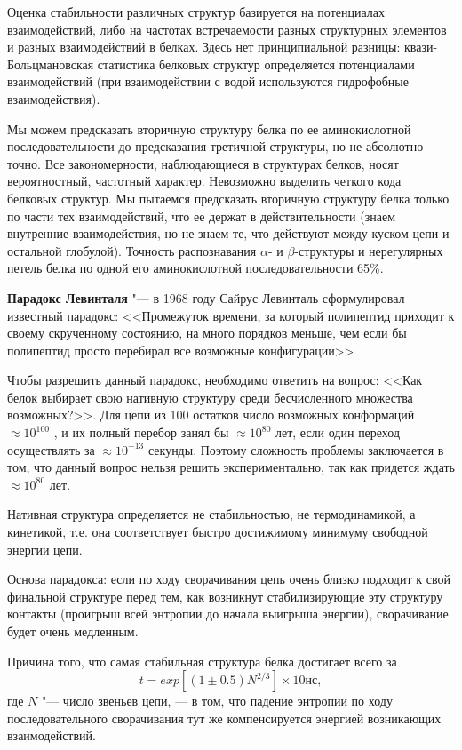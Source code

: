 \documentclass[12pt,a4paper,oneside]{book}
\begin{document}
Оценка стабильности различных структур базируется на потенциалах взаимодействий, либо на частотах встречаемости разных структурных элементов и разных взаимодействий в белках. Здесь нет принципиальной разницы: квази-Больцмановская статистика белковых структур определяется потенциалами взаимодействий (при взаимодействии с водой используются гидрофобные взаимодействия).

Мы можем предсказать вторичную структуру белка по ее аминокислотной последовательности до предсказания третичной структуры, но не абсолютно точно. Все закономерности, наблюдающиеся в структурах белков, носят вероятностный, частотный характер. Невозможно выделить четкого кода белковых структур. Мы пытаемся предсказать вторичную структуру белка только по части тех взаимодействий, что ее держат в действительности (знаем внутренние взаимодействия, но не знаем те, что действуют между куском цепи и остальной глобулой). Точность распознавания $\alpha$- и $\beta$-структуры и нерегулярных петель белка по одной его аминокислотной последовательности 65\%.

\textbf{Парадокс Левинталя} "--- в 1968 году Сайрус Левинталь сформулировал известный парадокс: <<Промежуток времени, за который полипептид приходит к своему скрученному состоянию, на много порядков меньше, чем если бы полипептид просто перебирал все возможные конфигурации>>

Чтобы разрешить данный парадокс, необходимо ответить на вопрос: <<Как белок выбирает свою нативную структуру среди бесчисленного множества возможных?>>. Для цепи из 100 остатков число возможных конформаций $\approx 10^{100}$ , и их полный перебор занял бы $\approx 10^{80}$ лет, если один переход осуществлять за $\approx 10^{-13}$ секунды. Поэтому сложность проблемы заключается в том, что данный вопрос нельзя решить экспериментально, так как придется ждать $\approx 10^{80}$ лет.

Нативная структура определяется не стабильностью, не термодинамикой, а кинетикой, т.е. она соответствует быстро достижимому минимуму свободной энергии цепи.

Основа парадокса: если по ходу сворачивания цепь очень близко подходит к свой финальной структуре перед тем, как возникнут стабилизирующие эту структуру контакты (проигрыш всей энтропии до начала выигрыша энергии), сворачивание будет очень медленным.

Причина того, что самая стабильная структура  белка достигает всего за
\begin{equation}
	t = exp \left[ (1 \pm 0.5 ) N^{2/3} \right]  \times 10 \text{нс},
\end{equation}
где $N$ "--- число звеньев цепи,
--- в том, что падение энтропии по ходу последовательного сворачивания тут же компенсируется энергией возникающих взаимодействий.
\end{document}
